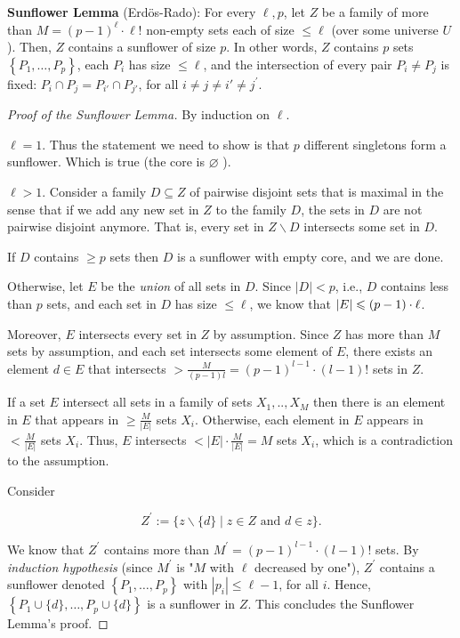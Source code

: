 \begin{svgraybox}
\textbf{Sunflower Lemma} (Erd\"os-Rado): For every $\ell, p$, let $Z$ be a family of more than $M=(p-1)^\ell \cdot \ell!$ non-empty sets each of size $\leqslant \ell$ (over some universe $U$). Then, $Z$ contains a sunflower of size $p$. In other words, $Z$ contains $p$ sets $\left\{P_1, \ldots, P_p\right\}$, each $P_i$ has size $\leqslant \ell$, and the intersection of every pair $P_i \neq P_j$ is fixed: $P_i \cap P_j=P_{i'} \cap P_{j'}$, for all $i \neq j \neq i' \neq j^{\prime}$.
\end{svgraybox}



\begin{proof}[Proof of the Sunflower Lemma]
By induction on $\ell$.

\Base  $\ell=1$. Thus the statement we need to show is that $p$ different singletons form a sunflower. Which is true (the core is $\varnothing$ ).


\induction $\ell>1$. Consider a family $D \subseteq Z$ of pairwise disjoint sets that is maximal in the sense that if we add any new set in $Z$ to the family $D$, the sets in $D$ are not pairwise disjoint anymore. That is, every set in $Z \backslash D$ intersects some set in $D$.

 If $D$ contains $\geq p$ sets then $D$ is a sunflower with empty core, and we are done.

 Otherwise, let $E$ be the \emph{union} of all sets in $D$.
Since $|D|<p$, i.e., $D$ contains less than $p$ sets, and each set in $D$ has size $\le \ell$, we know that $|E| \leqslant(p-1)\cdot\ell$.

\medskip 

Moreover, $E$ intersects every set in $Z$ by assumption.
Since $Z$ has more than $M$ sets by assumption, and each set intersects some element of $E$, there exists an element $d \in E$ that intersects $>\frac{M}{(p-1) l}=(p-1)^{l-1} \cdot(l-1)!$ sets in $Z$.


\begin{remark}
If a set $E$ intersect all sets in a family of sets $X_1, . ., X_M$ then there is an element in $E$ that appears in $\geq \frac{M}{|E|}$ sets $X_i$.
Otherwise, each element in $E$ appears in $<\frac{M}{|E|}$ sets $X_i$. Thus, $E$ intersects $<|E| \cdot \frac{M}{|E|}=M$ sets $X_i$, which is a contradiction to the assumption.
\end{remark}


Consider

$$
Z^{\prime}:=\{z \backslash\{d\} \mid z \in Z \text { and } d \in z\} .
$$


We know that $Z^{\prime}$ contains more than $M^{\prime}=(p-1)^{l-1} \cdot(l-1)!$ sets.
By \emph{induction hypothesis} (since $M^{\prime}$ is "$M$ with $\ell$ decreased by one"), $Z^{\prime}$ contains a sunflower denoted $\left\{P_1, \ldots, P_p\right\}$ with $\left|p_i\right| \leq \ell-1$, for all $i$.
Hence, $\left\{P_1 \cup\{d\}, \ldots, P_p \cup\{d\}\right\}$ is a sunflower in $Z$.
This concludes the Sunflower Lemma's proof.
\end{proof}



